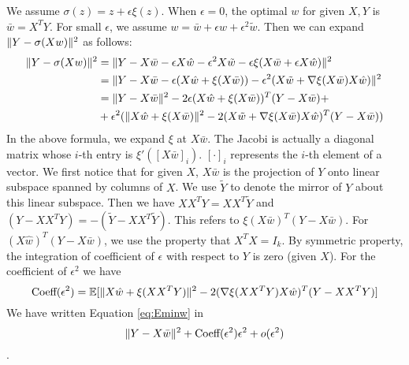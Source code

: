 \documentclass{article}
\DeclarePairedDelimiter\norm{\lVert}{\rVert}
\def\E{\mathbb{E}}
\begin{document}
We assume $\sigma(z) = z + \epsilon \xi(z)$.
When $\epsilon = 0$, the optimal $w$ for given $X, Y$ is
$\bar{w} =X^T Y $.
For small $\epsilon$, we assume
$w = \bar{w} + \epsilon \hat{w} + \epsilon^2 \tilde{w}$.
Then we can expand $\norm{Y - \sigma (X w ) }^2$ as follows:
\begin{align*}
\norm{Y - \sigma (X w ) }^2 &=
\norm{Y - X \bar{w} - \epsilon X \hat{w} -
\epsilon^2 X \tilde{w} - \epsilon \xi(X \bar{w} + \epsilon X\hat{w}) }^2 \\
& = \norm{ Y - X  \bar{w}  -
\epsilon (X\hat{w} + \xi(X \bar{w} )) -
\epsilon^2(X\tilde{w} + \nabla \xi(X \bar{w} )X\hat{w})}^2 \\
& = \norm{Y-X \bar{w}  }^2 -
2 \epsilon (X \hat{w} + \xi(X \bar{w}))^T (Y-X \bar{w}) +\\
& +\epsilon^2(\norm{X\hat{w} + \xi(X \bar{w})}^2 -
2 (X \tilde{w}+ \nabla \xi(X \bar{w})X\hat{w})^T(Y-X \bar{w}))
\end{align*}
In the above formula,  we expand $\xi$ at $X \bar{w}$.
The Jacobi is actually a diagonal matrix whose $i$-th entry is
$\xi'([X\bar{w}]_i)$.
$[\cdot]_i$ represents the $i$-th element of a vector.
We first notice that for given $X$,
$X\bar{w}$ is the projection of $Y$ onto linear subspace spanned by
columns of $X$.
We use $\tilde{Y}$ to denote the mirror of $Y$ about this linear subspace.
Then we have
$XX^T Y = XX^T \tilde{Y}$ and
$(Y- XX^TY) = -(\tilde{Y} - XX^T \tilde{Y})$.
This refers to $\xi(X\bar{w})^T (Y-X\bar{w})$.
For $(X\hat{w})^T (Y-X\bar{w})$,
we use the property that $X^T X = I_k$.
By symmetric property,
the integration of coefficient of $\epsilon$ with respect to $Y$
is zero (given $X$).
For the coefficient of $\epsilon^2$ we have
\begin{equation*}
\textrm{Coeff}(\epsilon^2) =
\E[\norm{X\hat{w} + \xi(XX^TY)}^2 -
2 (\nabla \xi(XX^TY)X\hat{w})^T(Y-XX^TY)]
\end{equation*}
We have written Equation \eqref{eq:Eminw} in
$$ \norm{Y - X \bar{w}}^2 + \textrm{Coeff}(\epsilon^2)
\epsilon^2 + o(\epsilon^2)$$.
\end{document}
